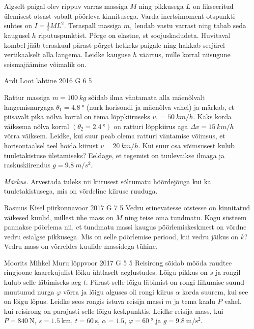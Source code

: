 \documentclass[11pt]{article}
\begin{document}
{{Algselt paigal olev rippuv varras massiga $M$ ning pikkusega $L$ on fikseeritud ülemisest otsast vabalt pöörleva kinnitusega. Varda inertsimoment otspunkti suhtes on $I=\frac{1}{3}ML^2$. Teraspall massiga $m_1$ lendab vastu varrast ning tabab seda kaugusel $h$ riputuspunktist. Põrge on elastne, st soojuskadudeta. Huvitaval kombel jääb teraskuul pärast põrget hetkeks paigale ning hakkab seejärel vertikaalselt alla langema. Leidke kauguse $h$ väärtus, mille korral niisugune seismajäämine võimalik on.
\fi
}

{Ardi Loot} %
{lahtine} %
{2016} %
{G 6} %
{5} %
{
\ifStatement
Rattur massiga $m=\SI{100}{kg}$ sõidab ilma väntamata alla mäenõlvalt langemisnurgaga
$\theta_{1}=\SI{4.8}{\degree}$ (nurk horisondi ja mäenõlva vahel)
ja märkab, et piisavalt pika nõlva korral on tema lõppkiiruseks $v_{1}=\SI{50}{km/h}$.
Kaks korda väiksema nõlva korral $(\theta_{2}=\SI{2.4}{\degree})$
on ratturi lõppkiirus aga $\Delta v=\SI{15}{km/h}$ võrra väiksem.
Leidke, kui suur peab olema ratturi väntamise võimsus, et horisontaalsel
teel hoida kiirust $v=\SI{20}{km/h}.$ Kui suur osa võimsusest kulub
tuuletakistuse ületamiseks? Eeldage, et tegemist on tuulevaikse ilmaga
ja raskuskiirendus $g=\SI{9.8}{m/s^{2}}$. 

\emph{Märkus.} Arvestada tuleks nii kiirusest sõltumatu hõõrdejõuga kui ka tuuletakistusega,
mis on võrdeline kiiruse ruuduga.
\fi
}

{Rasmus Kisel} %
{piirkonnavoor} %
{2017} %
{G 7} %
{5} %
{
\ifStatement
Vedru erinevatesse otstesse on kinnitatud väikesed kuulid, millest ühe mass on $M$ ning teise oma tundmatu. Kogu süsteem pannakse pöörlema nii, et tundmatu massi kaugus pöörlemiskeskmest on võrdne vedru esialgse pikkusega. Mis on selle pöörlemise periood, kui vedru jäikus on $k$? Vedru mass on võrreldes kuulide massidega tühine.
\fi
}

{Moorits Mihkel Muru} %
{lõppvoor} %
{2017} %
{G 5} %
{5} %
{
\ifStatement
Reisirong sõidab mööda raudtee ringjoone kaarekujulist lõiku ühtlaselt aeglustudes. Lõigu pikkus on $s$ ja rongil kulub selle läbimiseks aeg $t$. Pärast selle lõigu läbimist on rongi liikumise suund muutunud nurga $\varphi$ võrra ja lõigu alguses oli rongi kiirus $\alpha$ korda suurem, kui see on lõigu lõpus. Leidke seos rongis istuva reisija massi $m$ ja tema kaalu $P$ vahel, kui reisirong on parajasti selle lõigu keskpunktis. Leidke reisija mass, kui $P=\SI{840}{\newton}$, $s=\SI{1.5}{\kilo\meter}$, $t=\SI{60}{\second}$, $\alpha=\num{1.5}$, $\varphi=\SI{60}{\degree}$ ja $g=\SI{9.8}{\meter\per\second\squared}$.
\fi
}

}
\end{document}
